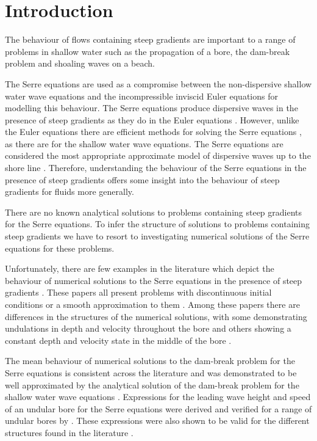 \documentclass[times]{elsarticle}
\begin{document}
\section{Introduction} \label{intro} 
The behaviour of flows containing steep gradients are important to a range of problems in shallow water such as the propagation of a bore, the dam-break problem and shoaling waves on a beach.

The Serre equations are used as a compromise between the non-dispersive shallow water wave equations and the incompressible inviscid Euler equations for modelling this behaviour. The Serre equations produce dispersive waves in the presence of steep gradients as they do in the Euler equations \cite{Mitsotakis-etal-2017}. However, unlike the Euler equations there are efficient methods for solving the Serre equations \cite{Hank-etal-2010-2034,Zoppou-etal-2016,Zoppou-etal-2017}, as there are for the shallow water wave equations. The Serre equations are considered the most appropriate approximate model of dispersive waves up to the shore line \cite{Bonneton-etal-2011-589,Bonneton-etal-2011-1479}. Therefore, understanding the behaviour of the Serre equations in the presence of steep gradients offers some insight into the behaviour of steep gradients for fluids more generally.

There are no known analytical solutions to problems containing steep gradients for the Serre equations. To infer the structure of solutions to problems containing steep gradients we have to resort to investigating numerical solutions of the Serre equations for these problems. 

Unfortunately, there are few examples in the literature which depict the behaviour of numerical solutions to the Serre equations in the presence of steep gradients \cite{El-etal-2006,Hank-etal-2010-2034,Mitsotakis-etal-2014,Mitsotakis-etal-2017,Zoppou-etal-2016,Zoppou-etal-2017}. These papers all present problems with discontinuous initial conditions \cite{Hank-etal-2010-2034,Zoppou-etal-2016,Zoppou-etal-2017} or a smooth approximation to them \cite{El-etal-2006,Mitsotakis-etal-2014,Mitsotakis-etal-2017}. Among these papers there are differences in the structures of the numerical solutions, with some demonstrating undulations in depth and velocity throughout the bore \cite{El-etal-2006,Zoppou-etal-2016,Zoppou-etal-2017} and others showing a constant depth and velocity state in the middle of the bore \cite{Hank-etal-2010-2034,Mitsotakis-etal-2014,Mitsotakis-etal-2017}.

The mean behaviour of numerical solutions to the dam-break problem for the Serre equations is consistent across the literature \cite{El-etal-2006,Zoppou-etal-2016,Zoppou-etal-2017,Hank-etal-2010-2034,Mitsotakis-etal-2014,Mitsotakis-etal-2017} and was demonstrated to be well approximated by the analytical solution of the dam-break problem for the shallow water wave equations \cite{Hank-etal-2010-2034,Mitsotakis-etal-2014}. Expressions for the leading wave height and speed of an undular bore for the Serre equations were derived and verified for a range of undular bores by \citet{El-etal-2006}. These expressions were also shown to be valid for the different structures found in the literature \cite{El-etal-2006,Mitsotakis-etal-2014}.
\end{document}
